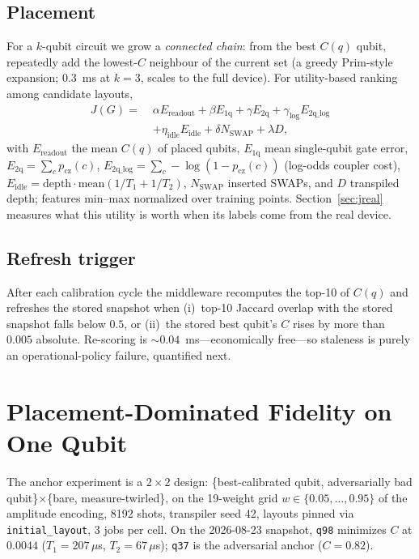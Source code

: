 \documentclass[journal,10pt,twocolumn]{IEEEtran}
\newcommand{\q}[1]{\texttt{q#1}}
\begin{document}
\subsection{Placement}
For a $k$-qubit circuit we grow a \emph{connected chain}: from the best $C(q)$ qubit, repeatedly add the lowest-$C$
neighbour of the current set (a greedy Prim-style expansion; $0.3$~ms at $k{=}3$, scales to the full device). For
utility-based ranking among candidate layouts,
\begin{equation}
\begin{aligned}
J(G)=\;&\alpha E_{\mathrm{readout}}+\beta E_{\mathrm{1q}}+\gamma E_{\mathrm{2q}}
+\gamma_{\log}E_{\mathrm{2q\_log}}\\
&+\eta_{\mathrm{idle}}E_{\mathrm{idle}}+\delta N_{\mathrm{SWAP}}+\lambda D,
\end{aligned}
\label{eq:j7}
\end{equation}
with $E_{\mathrm{readout}}$ the mean $C(q)$ of placed qubits, $E_{\mathrm{1q}}$ mean single-qubit gate error,
$E_{\mathrm{2q}}=\sum_c p_{\mathrm{cz}}(c)$, $E_{\mathrm{2q\_log}}=\sum_c-\log(1-p_{\mathrm{cz}}(c))$ (log-odds
coupler cost), $E_{\mathrm{idle}}=\mathrm{depth}\cdot\mathrm{mean}(1/T_1+1/T_2)$, $N_{\mathrm{SWAP}}$ inserted
SWAPs, and $D$ transpiled depth; features min--max normalized over training points. Section~\ref{sec:jreal}
measures what this utility is worth when its labels come from the real device.

\subsection{Refresh trigger}
\label{sec:trigger}
After each calibration cycle the middleware recomputes the top-10 of $C(q)$ and refreshes the stored snapshot when
(i)~top-10 Jaccard overlap with the stored snapshot falls below $0.5$, or (ii)~the stored best qubit's $C$ rises by
more than $0.005$ absolute. Re-scoring is $\sim0.04$~ms---economically free---so staleness is purely an
operational-policy failure, quantified next.

\section{Placement-Dominated Fidelity on One Qubit}
\label{sec:placement}
The anchor experiment is a $2\times2$ design: \{best-calibrated qubit, adversarially bad qubit\}$\times$\{bare,
measure-twirled\}, on the 19-weight grid $w\in\{0.05,\dots,0.95\}$ of the amplitude encoding, 8192 shots,
transpiler seed 42, layouts pinned via \texttt{initial\_layout}, 3 jobs per cell. On the 2026-08-23 snapshot,
\q{98} minimizes $C$ at $0.0044$ ($T_1{=}207\,\mu$s, $T_2{=}67\,\mu$s); \q{37} is the adversarial anchor
($C{=}0.82$).
\end{document}
